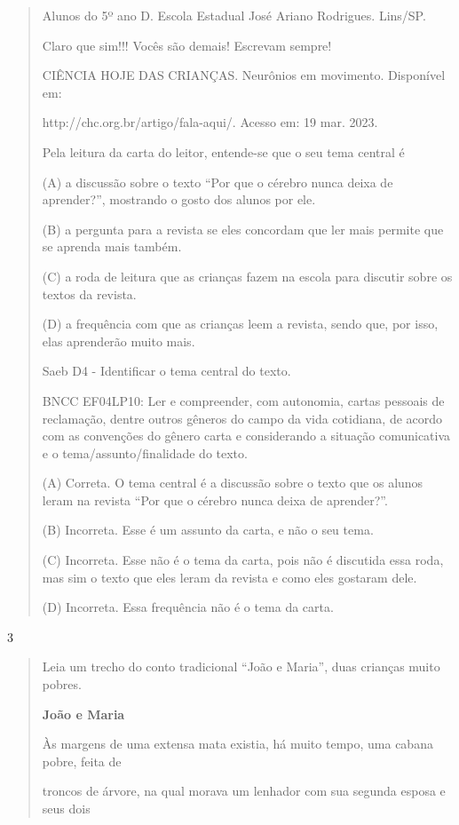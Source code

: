 \begin{itemize}
{{{\begin{itemize}
\begin{itemize}
\begin{itemize}
\begin{quote}
Alunos do 5º ano D. Escola Estadual José Ariano Rodrigues. Lins/SP.

Claro que sim!!! Vocês são demais! Escrevam sempre!

CIÊNCIA HOJE DAS CRIANÇAS. Neurônios em movimento. Disponível em:

http://chc.org.br/artigo/fala-aqui/. Acesso em: 19 mar. 2023.

Pela leitura da carta do leitor, entende-se que o seu tema central é

(A) a discussão sobre o texto ``Por que o cérebro nunca deixa de
aprender?'', mostrando o gosto dos alunos por ele.

(B) a pergunta para a revista se eles concordam que ler mais permite que
se aprenda mais também.

(C) a roda de leitura que as crianças fazem na escola para discutir
sobre os textos da revista.

(D) a frequência com que as crianças leem a revista, sendo que, por
isso, elas aprenderão muito mais.

Saeb D4 - Identificar o tema central do texto.

BNCC EF04LP10: Ler e compreender, com autonomia, cartas pessoais de
reclamação, dentre outros gêneros do campo da vida cotidiana, de acordo
com as convenções do gênero carta e considerando a situação comunicativa
e o tema/assunto/finalidade do texto.

(A) Correta. O tema central é a discussão sobre o texto que os alunos
leram na revista ``Por que o cérebro nunca deixa de aprender?''.

(B) Incorreta. Esse é um assunto da carta, e não o seu tema.

(C) Incorreta. Esse não é o tema da carta, pois não é discutida essa
roda, mas sim o texto que eles leram da revista e como eles gostaram
dele.

(D) Incorreta. Essa frequência não é o tema da carta.
\end{quote}

\num{3}

\begin{quote}
Leia um trecho do conto tradicional ``João e Maria'', duas crianças
muito pobres.

\textbf{João e Maria}

Às margens de uma extensa mata existia, há muito tempo, uma cabana
pobre, feita de

troncos de árvore, na qual morava um lenhador com sua segunda esposa e
seus dois


\end{quote}
\end{itemize}
\end{itemize}
\end{itemize}}}}
\end{itemize}
